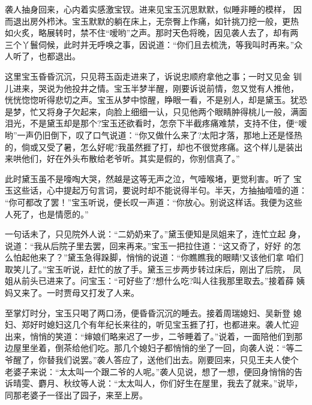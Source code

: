 袭人抽身回来，心内着实感激宝钗。进来见宝玉沉思默默，似睡非睡的模样，
因而退出房外栉沐。宝玉默默的躺在床上，无奈臀上作痛，如针挑刀挖一般，更热
如火炙，略展转时，禁不住“嗳哟”之声。那时天色将晚，因见袭人去了，却有两
三个丫鬟伺候，此时并无呼唤之事，因说道：“你们且去梳洗，等我叫时再来。”众
人听了，也都退出。

这里宝玉昏昏沉沉，只见蒋玉函走进来了，诉说忠顺府拿他之事；一时又见金
钏儿进来，哭说为他投井之情。宝玉半梦半醒，刚要诉说前情，忽又觉有人推他，
恍恍惚惚听得悲切之声。宝玉从梦中惊醒，睁眼一看，不是别人，却是黛玉。犹恐
是梦，忙又将身子欠起来，向脸上细细一认，只见他两个眼睛肿得桃儿一般，满面
泪光，不是黛玉却是那个?宝玉还欲看时，怎奈下半截疼痛难禁，支持不住，便“嗳
哟”一声仍旧倒下，叹了口气说道：“你又做什么来了?太阳才落，那地上还是怪热
的，倘或又受了暑，怎么好呢?我虽然捱了打，却也不很觉疼痛。这个样儿是装出
来哄他们，好在外头布散给老爷听。其实是假的，你别信真了。”

此时黛玉虽不是嚎啕大哭，然越是这等无声之泣，气噎喉堵，更觉利害。听了
宝玉这些话，心中提起万句言词，要说时却不能说得半句。半天，方抽抽噎噎的道：
“你可都改了罢！”宝玉听说，便长叹一声道：“你放心。别说这样话。我便为这些
人死了，也是情愿的。”

一句话未了，只见院外人说：“二奶奶来了。”黛玉便知是凤姐来了，连忙立起
身，说道：“我从后院子里去罢，回来再来。”宝玉一把拉住道：“这又奇了，好好
的怎么怕起他来了？”黛玉急得跺脚，悄悄的说道：“你瞧瞧我的眼睛!又该他们拿
咱们取笑儿了。”宝玉听说，赶忙的放了手。黛玉三步两步转过床后，刚出了后院，
凤姐从前头已进来了。问宝玉：“可好些了?想什么吃?叫人往我那里取去。”接着薛
姨妈又来了。一时贾母又打发了人来。

至掌灯时分，宝玉只喝了两口汤，便昏昏沉沉的睡去。接着周瑞媳妇、吴新登
媳妇、郑好时媳妇这几个有年纪长来往的，听见宝玉捱了打，也都进来。袭人忙迎
出来，悄悄的笑道：“婶娘们略来迟了一步，二爷睡着了。”说着，一面陪他们到那
边屋里坐着，倒茶给他们吃。那几个媳妇子都悄悄的坐了一回，向袭人说：“等二
爷醒了，你替我们说罢。”袭人答应了，送他们出去。刚要回来，只见王夫人使个
老婆子来说：“太太叫一个跟二爷的人呢。”袭人见说，想了一想，便回身悄悄的告
诉晴雯、麝月、秋纹等人说：“太太叫人，你们好生在屋里，我去了就来。”说毕，
同那老婆子一径出了园子，来至上房。

